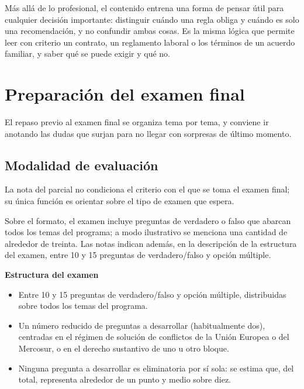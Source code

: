 \documentclass[12pt,oneside]{book}
\begin{document}
Más allá de lo profesional, el contenido entrena una forma de pensar útil para cualquier decisión importante: distinguir cuándo una regla obliga y cuándo es solo una recomendación, y no confundir ambas cosas. Es la misma lógica que permite leer con criterio un contrato, un reglamento laboral o los términos de un acuerdo familiar, y saber qué se puede exigir y qué no.

\chapter[Preparación del examen final]{Preparación del examen final}\label{cap:examen}

El repaso previo al examen final se organiza tema por tema, y conviene ir anotando las dudas que surjan para no llegar con sorpresas de último momento.

\section{Modalidad de evaluación}

La nota del parcial no condiciona el criterio con el que se toma el examen final; su única función es orientar sobre el tipo de examen que espera.

Sobre el formato, el examen incluye preguntas de verdadero o falso que abarcan todos los temas del programa; a modo ilustrativo se menciona una cantidad de alrededor de treinta. Las notas indican además, en la descripción de la estructura del examen, entre 10 y 15 preguntas de verdadero/falso y opción múltiple.

\begin{important}
\textbf{Estructura del examen}
\begin{itemize}
    \item Entre 10 y 15 preguntas de verdadero/falso y opción múltiple, distribuidas sobre todos los temas del programa.
    \item Un número reducido de preguntas a desarrollar (habitualmente dos), centradas en el régimen de solución de conflictos de la Unión Europea o del Mercosur, o en el derecho sustantivo de uno u otro bloque.
    \item Ninguna pregunta a desarrollar es eliminatoria por sí sola: se estima que, del total, representa alrededor de un punto y medio sobre diez.
\end{itemize}
\end{important}
\end{document}
